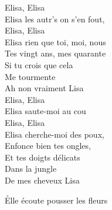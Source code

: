 \documentclass{novel}
\begin{document}
{\begin{minipage}[t][0.55\textheight][t]{\textwidth}
\begin{multicols}{2}
Elisa, Elisa \\
Elisa les autr's on s'en fout, \\
Elisa, Elisa \\
Elisa rien que toi, moi, nous \\
Tes vingt ans, mes quarante \\
Si tu crois que cela \\
Me tourmente \\
Ah non vraiment Lisa \\

Elisa, Elisa \\
Elisa saute-moi au cou \\
Elisa, Elisa \\
Elisa cherche-moi des poux, \\
Enfonce bien tes ongles, \\
Et tes doigts délicats \\
Dans la jungle \\
De mes cheveux Lisa \\
\end{multicols}
\end{minipage}
}

\newpage
\normalsize

\h*{Elle écoute pousser les fleurs}
\end{document}
